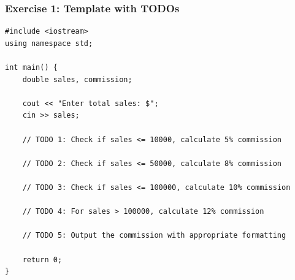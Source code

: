 \documentclass{beamer}
\begin{document}
\begin{frame}[fragile]
\frametitle{Exercise 1: Template with TODOs}

\begin{verbatim}
#include <iostream>
using namespace std;

int main() {
    double sales, commission;
    
    cout << "Enter total sales: $";
    cin >> sales;
    
    // TODO 1: Check if sales <= 10000, calculate 5% commission
    
    // TODO 2: Check if sales <= 50000, calculate 8% commission
    
    // TODO 3: Check if sales <= 100000, calculate 10% commission
    
    // TODO 4: For sales > 100000, calculate 12% commission
    
    // TODO 5: Output the commission with appropriate formatting
    
    return 0;
}
\end{verbatim}
\end{frame}
\end{document}

